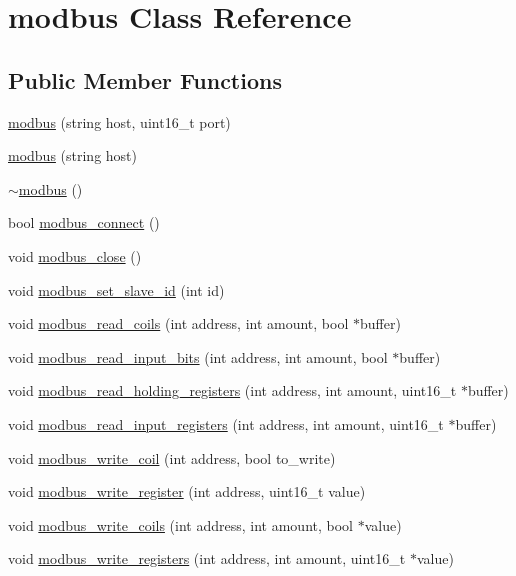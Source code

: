 \hypertarget{classmodbus}{}\section{modbus Class Reference}
\label{classmodbus}
\subsection*{Public Member Functions}
\begin{DoxyCompactItemize}
\item 
\mbox{\hyperlink{classmodbus_a8a92b53fdbacc156cd2b5f21a244b5f2}{modbus}} (string host, uint16\+\_\+t port)
\item 
\mbox{\hyperlink{classmodbus_a6902af6b4f02a3cc07ef040c389360d2}{modbus}} (string host)
\item 
\mbox{\hyperlink{classmodbus_a28daaab3b7a8c838636c639d2eb14e4f}{$\sim$modbus}} ()
\item 
bool \mbox{\hyperlink{classmodbus_a13709baee171c97231a33ec4edfa1051}{modbus\+\_\+connect}} ()
\item 
void \mbox{\hyperlink{classmodbus_a9b0db97f942a083431b5374055d4bf1b}{modbus\+\_\+close}} ()
\item 
void \mbox{\hyperlink{classmodbus_a6880efa2a3859ce0752c016588998ffe}{modbus\+\_\+set\+\_\+slave\+\_\+id}} (int id)
\item 
void \mbox{\hyperlink{classmodbus_ae4f8480f4062d7bed3ff463da64d0027}{modbus\+\_\+read\+\_\+coils}} (int address, int amount, bool $\ast$buffer)
\item 
void \mbox{\hyperlink{classmodbus_a22e2773a0475961956eeee0f7056c6c0}{modbus\+\_\+read\+\_\+input\+\_\+bits}} (int address, int amount, bool $\ast$buffer)
\item 
void \mbox{\hyperlink{classmodbus_a2a2079dc10a200764984497fea7c85b3}{modbus\+\_\+read\+\_\+holding\+\_\+registers}} (int address, int amount, uint16\+\_\+t $\ast$buffer)
\item 
void \mbox{\hyperlink{classmodbus_a228dcada3a0f37e9d1f346842fb29a39}{modbus\+\_\+read\+\_\+input\+\_\+registers}} (int address, int amount, uint16\+\_\+t $\ast$buffer)
\item 
void \mbox{\hyperlink{classmodbus_a8717e5472d5a536beb0308bdeeac2233}{modbus\+\_\+write\+\_\+coil}} (int address, bool to\+\_\+write)
\item 
void \mbox{\hyperlink{classmodbus_ab70c70f8b76075be92304f5f4bad9c6b}{modbus\+\_\+write\+\_\+register}} (int address, uint16\+\_\+t value)
\item 
void \mbox{\hyperlink{classmodbus_a26201b5f872bce56f665d905ffcaaa97}{modbus\+\_\+write\+\_\+coils}} (int address, int amount, bool $\ast$value)
\item 
void \mbox{\hyperlink{classmodbus_ad91dab7ef70066e3fcb03cf6d9a72cc3}{modbus\+\_\+write\+\_\+registers}} (int address, int amount, uint16\+\_\+t $\ast$value)
\end{DoxyCompactItemize}


